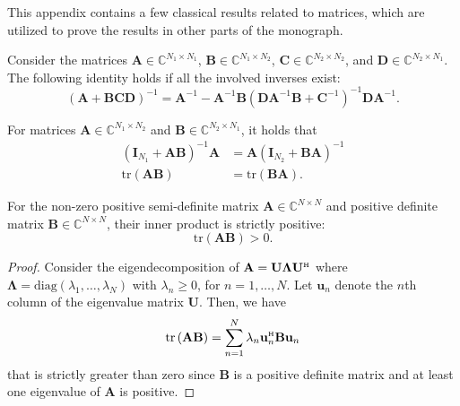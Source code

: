 \documentclass[SIG,biber]{nowfnt}
\newcommand{\vect}[1]{\mathbf{#1}}
\def\diag{\mathrm{diag}}
\def\tr{\mathrm{tr}}
\def\Htran{\mbox{\tiny $\mathrm{H}$}}
\begin{document}
This appendix contains a few classical results related to matrices, which are utilized to prove the results in other parts of the monograph.


\begin{lemma} \label{lemma:matrix-inversion}
	Consider the matrices $\vect{A} \in \mathbb{C}^{N_1 \times N_1}$, $\vect{B} \in \mathbb{C}^{N_1 \times N_2}$, $\vect{C} \in \mathbb{C}^{N_2 \times N_2}$, and $\vect{D} \in \mathbb{C}^{N_2 \times N_1}$. The following identity holds if all the involved inverses exist:
	\begin{equation}
	(\vect{A} + \vect{B} \vect{C} \vect{D} )^{-1} = \vect{A}^{-1} - \vect{A}^{-1} \vect{B} (\vect{D} \vect{A}^{-1}  \vect{B} + \vect{C}^{-1}  )^{-1} \vect{D} \vect{A}^{-1} .
	\end{equation}
\end{lemma}

\begin{lemma} \label{lemma-matrix-identities}
For matrices $\vect{A} \in \mathbb{C}^{N_1 \times N_2}$ and $\vect{B} \in \mathbb{C}^{N_2 \times N_1}$, it holds that
\begin{align} 
\left( \vect{I}_{N_1} + \vect{A} \vect{B} \right)^{-1} \vect{A} &= \vect{A} \left( \vect{I}_{N_2} +  \vect{B} \vect{A} \right)^{-1} \label{eq:matrix-identity-commutation-inverse} \\
\tr \left( \vect{A} \vect{B}  \right) &= \tr \left(\vect{B}  \vect{A}  \right).   \label{eq:matrix-identity-trace-commutation} 
\end{align}
\end{lemma}


\begin{lemma} \label{lemma-nonorthogonal-positive-semidefinite}
	For the non-zero positive semi-definite matrix $\vect{A} \in \mathbb{C}^{N \times N}$ and positive definite matrix $\vect{B} \in \mathbb{C}^{N \times N}$, their inner product is strictly positive:
	\begin{equation}
	\tr\left(\vect{A}\vect{B}\right)>0.
	\end{equation}
\end{lemma}
\begin{proof}
	Consider the eigendecomposition of $\vect{A}=\vect{U}\vect{\Lambda}\vect{U}^{\Htran}$ where $\vect{\Lambda}=\diag\left(\lambda_1,\ldots,\lambda_N\right)$ with $\lambda_n\geq0$, for $n=1,\ldots,N$. Let $\vect{u}_n$ denote the $n$th column of the eigenvalue matrix $\vect{U}$. Then, we have
	\begin{equation}
	\tr\left(\vect{A}\vect{B}\right)=\sum_{n=1}^N\lambda_n\vect{u}_n^{\Htran}\vect{B}\vect{u}_n
	\end{equation}
	that is strictly greater than zero since $\vect{B}$ is a positive definite matrix and at least one eigenvalue of $\vect{A}$ is positive.
\end{proof}
\end{document}
